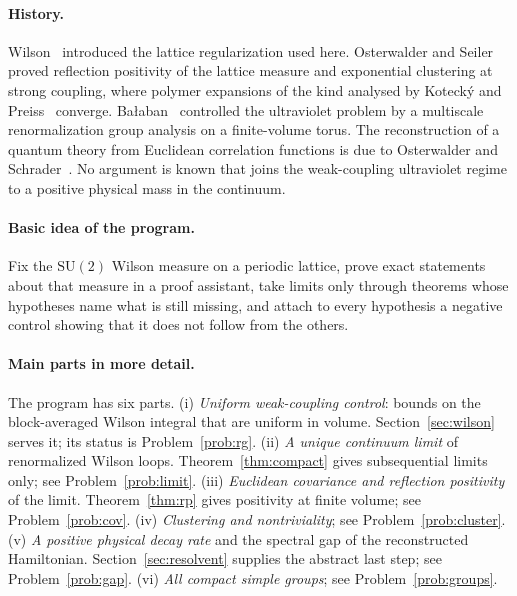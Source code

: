 \documentclass[11pt]{article}
\numberwithin{equation}{subsection}
\theoremstyle{plain}
\theoremstyle{definition}
\newcommand{\SU}{\mathrm{SU}}
\begin{document}
\paragraph{History.} Wilson~\cite{Wilson} introduced the lattice regularization used here.
Osterwalder and Seiler~\cite{OsterwalderSeiler} proved reflection positivity of the lattice
measure and exponential clustering at strong coupling, where polymer expansions of the kind
analysed by Koteck\'y and Preiss~\cite{KoteckyPreiss} converge. Ba\l{}aban~\cite{Balaban}
controlled the ultraviolet problem by a multiscale renormalization group analysis on a
finite-volume torus. The reconstruction of a quantum theory from Euclidean correlation
functions is due to Osterwalder and Schrader~\cite{OsterwalderSchrader}. No argument is known
that joins the weak-coupling ultraviolet regime to a positive physical mass in the continuum.

\paragraph{Basic idea of the program.} Fix the $\SU(2)$ Wilson measure on a periodic lattice,
prove exact statements about that measure in a proof assistant, take limits only through
theorems whose hypotheses name what is still missing, and attach to every hypothesis a negative
control showing that it does not follow from the others.

\paragraph{Main parts in more detail.} The program has six parts.
(i) \emph{Uniform weak-coupling control}: bounds on the block-averaged Wilson integral that are
uniform in volume. Section~\ref{sec:wilson} serves it; its status is Problem~\ref{prob:rg}.
(ii) \emph{A unique continuum limit} of renormalized Wilson loops. Theorem~\ref{thm:compact}
gives subsequential limits only; see Problem~\ref{prob:limit}.
(iii) \emph{Euclidean covariance and reflection positivity} of the limit.
Theorem~\ref{thm:rp} gives positivity at finite volume; see Problem~\ref{prob:cov}.
(iv) \emph{Clustering and nontriviality}; see Problem~\ref{prob:cluster}.
(v) \emph{A positive physical decay rate} and the spectral gap of the reconstructed
Hamiltonian. Section~\ref{sec:resolvent} supplies the abstract last step; see
Problem~\ref{prob:gap}.
(vi) \emph{All compact simple groups}; see Problem~\ref{prob:groups}.
\end{document}
